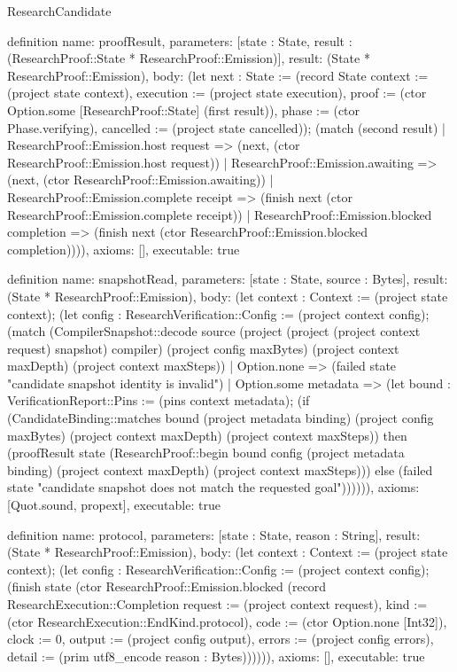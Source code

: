 \begin{lexlean}{ResearchCandidate}
\begin{semanticmodule}
definition{
 name: proofResult,
 parameters: [state : State, result : (ResearchProof::State * ResearchProof::Emission)],
 result: (State * ResearchProof::Emission),
 body: (let next : State := (record State {context := (project state context), execution := (project state execution), proof := (ctor Option.some [ResearchProof::State] (first result)), phase := (ctor Phase.verifying), cancelled := (project state cancelled)}); (match (second result) | ResearchProof::Emission.host request => (next, (ctor ResearchProof::Emission.host request)) | ResearchProof::Emission.awaiting => (next, (ctor ResearchProof::Emission.awaiting)) | ResearchProof::Emission.complete receipt => (finish next (ctor ResearchProof::Emission.complete receipt)) | ResearchProof::Emission.blocked completion => (finish next (ctor ResearchProof::Emission.blocked completion)))),
 axioms: [],
 executable: true
}

definition{
 name: snapshotRead,
 parameters: [state : State, source : Bytes],
 result: (State * ResearchProof::Emission),
 body: (let context : Context := (project state context); (let config : ResearchVerification::Config := (project context config); (match (CompilerSnapshot::decode source (project (project (project context request) snapshot) compiler) (project config maxBytes) (project context maxDepth) (project context maxSteps)) | Option.none => (failed state "candidate snapshot identity is invalid") | Option.some metadata => (let bound : VerificationReport::Pins := (pins context metadata); (if (CandidateBinding::matches bound (project metadata binding) (project config maxBytes) (project context maxDepth) (project context maxSteps)) then (proofResult state (ResearchProof::begin bound config (project metadata binding) (project context maxDepth) (project context maxSteps))) else (failed state "candidate snapshot does not match the requested goal")))))),
 axioms: [Quot.sound, propext],
 executable: true
}

definition{
 name: protocol,
 parameters: [state : State, reason : String],
 result: (State * ResearchProof::Emission),
 body: (let context : Context := (project state context); (let config : ResearchVerification::Config := (project context config); (finish state (ctor ResearchProof::Emission.blocked (record ResearchExecution::Completion {request := (project context request), kind := (ctor ResearchExecution::EndKind.protocol), code := (ctor Option.none [Int32]), clock := 0, output := (project config output), errors := (project config errors), detail := (prim utf8_encode reason : Bytes)}))))),
 axioms: [],
 executable: true
}


\end{semanticmodule}
\end{lexlean}
